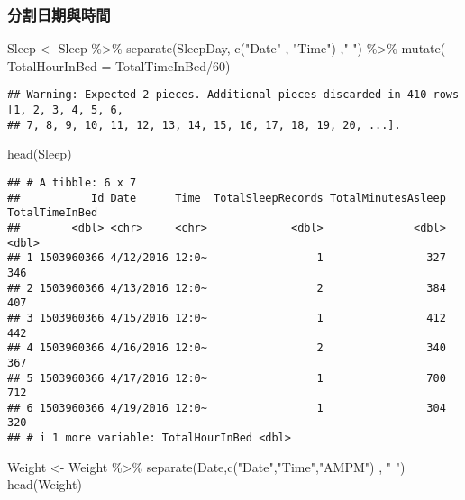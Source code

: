 \documentclass[
]{article}
\newenvironment{Shaded}{\begin{snugshade}}{\end{snugshade}}
\newcommand{\AttributeTok}[1]{\textcolor[rgb]{0.77,0.63,0.00}{#1}}
\newcommand{\DecValTok}[1]{\textcolor[rgb]{0.00,0.00,0.81}{#1}}
\newcommand{\FunctionTok}[1]{\textcolor[rgb]{0.00,0.00,0.00}{#1}}
\newcommand{\NormalTok}[1]{#1}
\newcommand{\OtherTok}[1]{\textcolor[rgb]{0.56,0.35,0.01}{#1}}
\newcommand{\SpecialCharTok}[1]{\textcolor[rgb]{0.00,0.00,0.00}{#1}}
\newcommand{\StringTok}[1]{\textcolor[rgb]{0.31,0.60,0.02}{#1}}
\begin{document}
\hypertarget{ux5206ux5272ux65e5ux671fux8207ux6642ux9593}{%
\subsubsection{分割日期與時間}\label{ux5206ux5272ux65e5ux671fux8207ux6642ux9593}}

\begin{Shaded}
\begin{Highlighting}[]
\NormalTok{Sleep }\OtherTok{\textless{}{-}}\NormalTok{ Sleep }\SpecialCharTok{\%\textgreater{}\%} 
  \FunctionTok{separate}\NormalTok{(SleepDay, }\FunctionTok{c}\NormalTok{(}\StringTok{"Date"}\NormalTok{ , }\StringTok{"Time"}\NormalTok{) ,}\StringTok{" "}\NormalTok{) }\SpecialCharTok{\%\textgreater{}\%}
  \FunctionTok{mutate}\NormalTok{( }\AttributeTok{TotalHourInBed =}\NormalTok{ TotalTimeInBed}\SpecialCharTok{/}\DecValTok{60}\NormalTok{)}
\end{Highlighting}
\end{Shaded}

\begin{verbatim}
## Warning: Expected 2 pieces. Additional pieces discarded in 410 rows [1, 2, 3, 4, 5, 6,
## 7, 8, 9, 10, 11, 12, 13, 14, 15, 16, 17, 18, 19, 20, ...].
\end{verbatim}

\begin{Shaded}
\begin{Highlighting}[]
\FunctionTok{head}\NormalTok{(Sleep)}
\end{Highlighting}
\end{Shaded}

\begin{verbatim}
## # A tibble: 6 x 7
##           Id Date      Time  TotalSleepRecords TotalMinutesAsleep TotalTimeInBed
##        <dbl> <chr>     <chr>             <dbl>              <dbl>          <dbl>
## 1 1503960366 4/12/2016 12:0~                 1                327            346
## 2 1503960366 4/13/2016 12:0~                 2                384            407
## 3 1503960366 4/15/2016 12:0~                 1                412            442
## 4 1503960366 4/16/2016 12:0~                 2                340            367
## 5 1503960366 4/17/2016 12:0~                 1                700            712
## 6 1503960366 4/19/2016 12:0~                 1                304            320
## # i 1 more variable: TotalHourInBed <dbl>
\end{verbatim}

\begin{Shaded}
\begin{Highlighting}[]
\NormalTok{Weight }\OtherTok{\textless{}{-}}\NormalTok{ Weight }\SpecialCharTok{\%\textgreater{}\%} 
  \FunctionTok{separate}\NormalTok{(Date,}\FunctionTok{c}\NormalTok{(}\StringTok{"Date"}\NormalTok{,}\StringTok{"Time"}\NormalTok{,}\StringTok{"AMPM"}\NormalTok{) , }\StringTok{" "}\NormalTok{)}
\FunctionTok{head}\NormalTok{(Weight)}
\end{Highlighting}
\end{Shaded}
\end{document}
